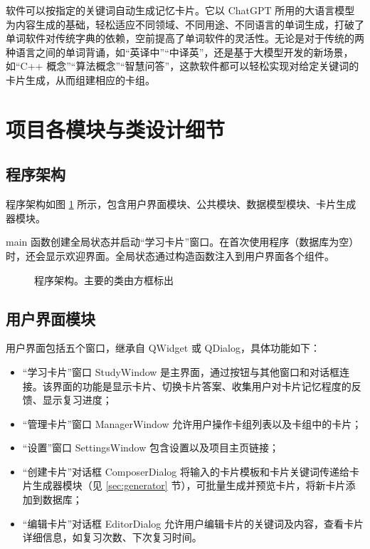 \documentclass[12pt]{article}
\begin{document}
软件可以按指定的关键词自动生成记忆卡片。它以 ChatGPT 所用的大语言模型为内容生成的基础，轻松适应不同领域、不同用途、不同语言的单词生成，打破了单词软件对传统字典的依赖，空前提高了单词软件的灵活性。无论是对于传统的两种语言之间的单词背诵，如“英译中”“中译英”，还是基于大模型开发的新场景，如“C++ 概念”“算法概念”“智慧问答”，这款软件都可以轻松实现对给定关键词的卡片生成，从而组建相应的卡组。

\section{项目各模块与类设计细节}

\subsection{程序架构}

程序架构如图 \ref{fig:structure-chart} 所示，包含用户界面模块、公共模块、数据模型模块、卡片生成器模块。

main 函数创建全局状态并启动“学习卡片”窗口。在首次使用程序（数据库为空）时，还会显示欢迎界面。全局状态通过构造函数注入到用户界面各个组件。

\begin{figure}[t]
  \centering
  
  \caption{程序架构。主要的类由方框标出}\label{fig:structure-chart}
\end{figure}

\subsection{用户界面模块}

用户界面包括五个窗口，继承自 QWidget 或 QDialog，具体功能如下：

\begin{itemize}
  \item “学习卡片”窗口 StudyWindow 是主界面，通过按钮与其他窗口和对话框连接。该界面的功能是显示卡片、切换卡片答案、收集用户对卡片记忆程度的反馈、显示复习进度；
  \item “管理卡片”窗口 ManagerWindow 允许用户操作卡组列表以及卡组中的卡片；
  \item “设置”窗口 SettingsWindow 包含设置以及项目主页链接；
  \item “创建卡片”对话框 ComposerDialog 将输入的卡片模板和卡片关键词传递给卡片生成器模块（见 \ref{sec:generator} 节），可批量生成并预览卡片，将新卡片添加到数据库；
  \item “编辑卡片”对话框 EditorDialog 允许用户编辑卡片的关键词及内容，查看卡片详细信息，如复习次数、下次复习时间。
\end{itemize}
\end{document}
